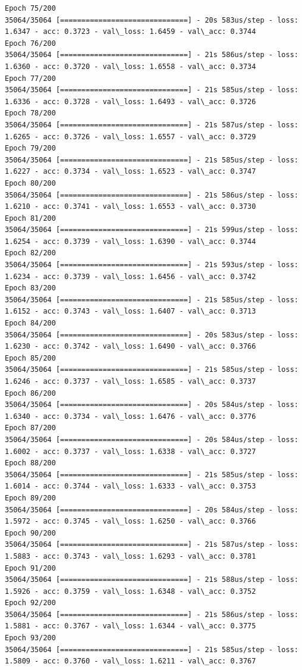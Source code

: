 \documentclass[11pt]{article}
\begin{document}
\begin{Verbatim}[commandchars=\\\{\}]
Epoch 75/200
35064/35064 [==============================] - 20s 583us/step - loss: 1.6347 - acc: 0.3723 - val\_loss: 1.6459 - val\_acc: 0.3744
Epoch 76/200
35064/35064 [==============================] - 21s 586us/step - loss: 1.6360 - acc: 0.3720 - val\_loss: 1.6558 - val\_acc: 0.3734
Epoch 77/200
35064/35064 [==============================] - 21s 585us/step - loss: 1.6336 - acc: 0.3728 - val\_loss: 1.6493 - val\_acc: 0.3726
Epoch 78/200
35064/35064 [==============================] - 21s 587us/step - loss: 1.6265 - acc: 0.3726 - val\_loss: 1.6557 - val\_acc: 0.3729
Epoch 79/200
35064/35064 [==============================] - 21s 585us/step - loss: 1.6227 - acc: 0.3734 - val\_loss: 1.6523 - val\_acc: 0.3747
Epoch 80/200
35064/35064 [==============================] - 21s 586us/step - loss: 1.6210 - acc: 0.3741 - val\_loss: 1.6553 - val\_acc: 0.3730
Epoch 81/200
35064/35064 [==============================] - 21s 599us/step - loss: 1.6254 - acc: 0.3739 - val\_loss: 1.6390 - val\_acc: 0.3744
Epoch 82/200
35064/35064 [==============================] - 21s 593us/step - loss: 1.6234 - acc: 0.3739 - val\_loss: 1.6456 - val\_acc: 0.3742
Epoch 83/200
35064/35064 [==============================] - 21s 585us/step - loss: 1.6152 - acc: 0.3743 - val\_loss: 1.6407 - val\_acc: 0.3713
Epoch 84/200
35064/35064 [==============================] - 20s 583us/step - loss: 1.6230 - acc: 0.3742 - val\_loss: 1.6490 - val\_acc: 0.3766
Epoch 85/200
35064/35064 [==============================] - 21s 585us/step - loss: 1.6246 - acc: 0.3737 - val\_loss: 1.6585 - val\_acc: 0.3737
Epoch 86/200
35064/35064 [==============================] - 20s 584us/step - loss: 1.6340 - acc: 0.3734 - val\_loss: 1.6476 - val\_acc: 0.3776
Epoch 87/200
35064/35064 [==============================] - 20s 584us/step - loss: 1.6002 - acc: 0.3737 - val\_loss: 1.6338 - val\_acc: 0.3727
Epoch 88/200
35064/35064 [==============================] - 21s 585us/step - loss: 1.6014 - acc: 0.3744 - val\_loss: 1.6333 - val\_acc: 0.3753
Epoch 89/200
35064/35064 [==============================] - 20s 584us/step - loss: 1.5972 - acc: 0.3745 - val\_loss: 1.6250 - val\_acc: 0.3766
Epoch 90/200
35064/35064 [==============================] - 21s 587us/step - loss: 1.5883 - acc: 0.3743 - val\_loss: 1.6293 - val\_acc: 0.3781
Epoch 91/200
35064/35064 [==============================] - 21s 588us/step - loss: 1.5926 - acc: 0.3759 - val\_loss: 1.6348 - val\_acc: 0.3752
Epoch 92/200
35064/35064 [==============================] - 21s 586us/step - loss: 1.5881 - acc: 0.3767 - val\_loss: 1.6344 - val\_acc: 0.3775
Epoch 93/200
35064/35064 [==============================] - 21s 585us/step - loss: 1.5809 - acc: 0.3760 - val\_loss: 1.6211 - val\_acc: 0.3767

\end{Verbatim}
\end{document}
